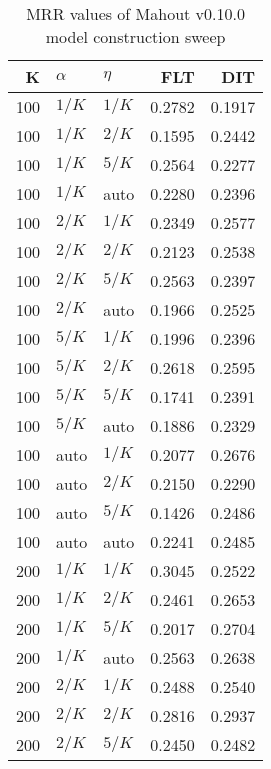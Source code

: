 
\begin{table}
\begin{spacing}{1.2}
\centering
\caption{MRR values of Mahout v0.10.0 model construction sweep}
\label{table:mahout_model_sweep}
\vspace{0.2em}
\parbox{.45\linewidth}{\centering \begin{tabular}{rll|rr}
\toprule
   K &  $\alpha$ &    $\eta$ & FLT & DIT \\
\midrule
 100 &  $1/K$ &  $1/K$ &           0.2782 & 0.1917 \\
 100 &  $1/K$ &  $2/K$ &           0.1595 & 0.2442 \\
 100 &  $1/K$ &  $5/K$ &           0.2564 & 0.2277 \\
 100 &  $1/K$ &   auto &           0.2280 & 0.2396 \\
 100 &  $2/K$ &  $1/K$ &           0.2349 & 0.2577 \\
 100 &  $2/K$ &  $2/K$ &           0.2123 & 0.2538 \\
 100 &  $2/K$ &  $5/K$ &           0.2563 & 0.2397 \\
 100 &  $2/K$ &   auto &           0.1966 & 0.2525 \\
 100 &  $5/K$ &  $1/K$ &           0.1996 & 0.2396 \\
 100 &  $5/K$ &  $2/K$ &           0.2618 & 0.2595 \\
 100 &  $5/K$ &  $5/K$ &           0.1741 & 0.2391 \\
 100 &  $5/K$ &   auto &           0.1886 & 0.2329 \\
 100 &   auto &  $1/K$ &           0.2077 & 0.2676 \\
 100 &   auto &  $2/K$ &           0.2150 & 0.2290 \\
 100 &   auto &  $5/K$ &           0.1426 & 0.2486 \\
 100 &   auto &   auto &           0.2241 & 0.2485 \\
 200 &  $1/K$ &  $1/K$ &           0.3045 & 0.2522 \\
 200 &  $1/K$ &  $2/K$ &           0.2461 & 0.2653 \\
 200 &  $1/K$ &  $5/K$ &           0.2017 & 0.2704 \\
 200 &  $1/K$ &   auto &           0.2563 & 0.2638 \\
 200 &  $2/K$ &  $1/K$ &           0.2488 & 0.2540 \\
 200 &  $2/K$ &  $2/K$ &           0.2816 & 0.2937 \\
 200 &  $2/K$ &  $5/K$ &           0.2450 & 0.2482 \\

\end{tabular}}
\end{spacing}
\end{table}
